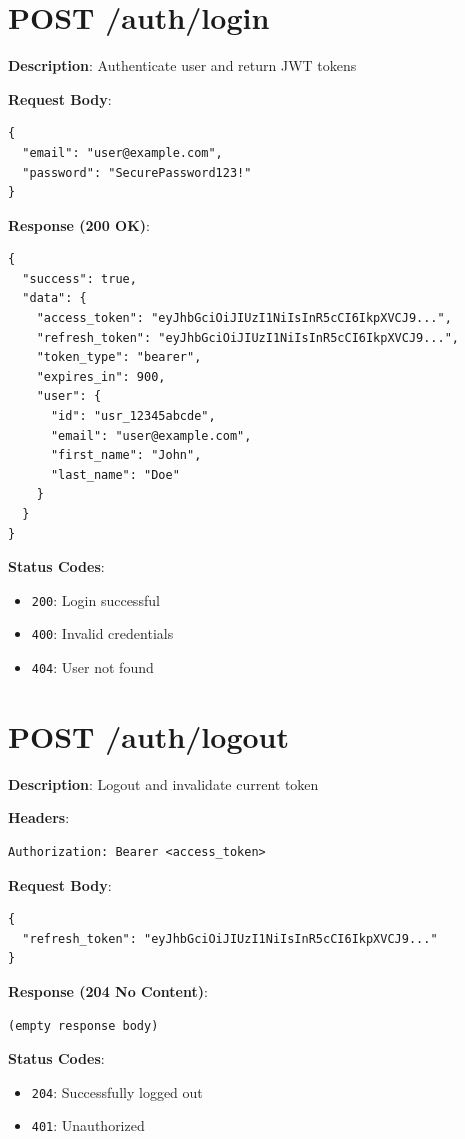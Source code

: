\documentclass[12pt,a4paper]{report}
\begin{document}
\section{POST /auth/login}

\textbf{Description}: Authenticate user and return JWT tokens

\textbf{Request Body}:
\begin{lstlisting}
{
  "email": "user@example.com",
  "password": "SecurePassword123!"
}
\end{lstlisting}

\textbf{Response (200 OK)}:
\begin{lstlisting}
{
  "success": true,
  "data": {
    "access_token": "eyJhbGciOiJIUzI1NiIsInR5cCI6IkpXVCJ9...",
    "refresh_token": "eyJhbGciOiJIUzI1NiIsInR5cCI6IkpXVCJ9...",
    "token_type": "bearer",
    "expires_in": 900,
    "user": {
      "id": "usr_12345abcde",
      "email": "user@example.com",
      "first_name": "John",
      "last_name": "Doe"
    }
  }
}
\end{lstlisting}

\textbf{Status Codes}:
\begin{itemize}
    \item \texttt{200}: Login successful
    \item \texttt{400}: Invalid credentials
    \item \texttt{404}: User not found
\end{itemize}

\section{POST /auth/logout}

\textbf{Description}: Logout and invalidate current token

\textbf{Headers}:
\begin{lstlisting}
Authorization: Bearer <access_token>
\end{lstlisting}

\textbf{Request Body}:
\begin{lstlisting}
{
  "refresh_token": "eyJhbGciOiJIUzI1NiIsInR5cCI6IkpXVCJ9..."
}
\end{lstlisting}

\textbf{Response (204 No Content)}:
\begin{lstlisting}
(empty response body)
\end{lstlisting}

\textbf{Status Codes}:
\begin{itemize}
    \item \texttt{204}: Successfully logged out
    \item \texttt{401}: Unauthorized
\end{itemize}
\end{document}
